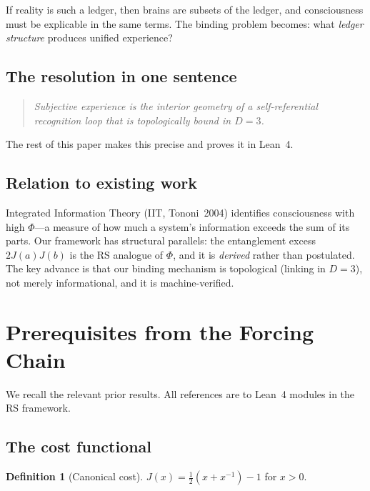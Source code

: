 \documentclass[11pt,a4paper]{article}
\theoremstyle{plain}
\theoremstyle{definition}
\newtheorem{definition}[theorem]{Definition}
\theoremstyle{remark}
\newcommand{\Jcost}{J}
\begin{document}
If reality is such a ledger, then brains are subsets of the ledger, and
consciousness must be explicable in the same terms.  The binding problem
becomes: what \emph{ledger structure} produces unified experience?

\subsection{The resolution in one sentence}

\begin{quote}
\itshape
Subjective experience is the interior geometry of a self-referential
recognition loop that is topologically bound in $D = 3$.
\end{quote}

The rest of this paper makes this precise and proves it in Lean~4.

\subsection{Relation to existing work}

Integrated Information Theory (IIT, Tononi~2004) identifies
consciousness with high $\Phi$---a measure of how much a system's
information exceeds the sum of its parts.  Our framework has structural
parallels: the entanglement excess $2\Jcost(a)\Jcost(b)$ is the RS
analogue of $\Phi$, and it is \emph{derived} rather than postulated.
The key advance is that our binding mechanism is topological (linking
in $D = 3$), not merely informational, and it is machine-verified.

\section{Prerequisites from the Forcing Chain}
\label{sec:prereq}

We recall the relevant prior results.  All references are to Lean~4
modules in the RS framework.

\subsection{The cost functional}

\begin{definition}[Canonical cost]
$\Jcost(x) = \tfrac{1}{2}(x + x^{-1}) - 1$ for $x > 0$.
\end{definition}
\end{document}
